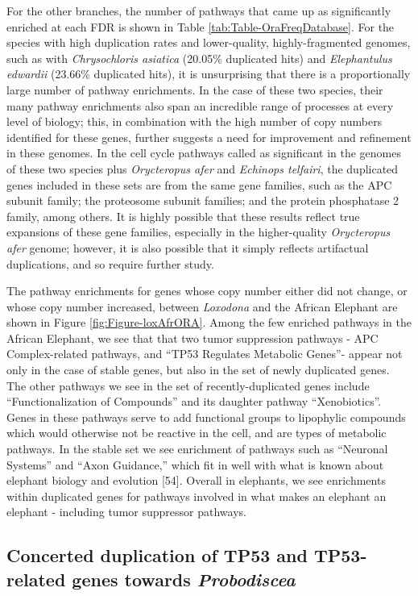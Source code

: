 \documentclass[]{elsarticle} %
\begin{document}
For the other branches, the number of pathways that came up as significantly enriched at each FDR is shown in Table \ref{tab:Table-OraFreqDatabase}. For the species with high duplication rates and lower-quality, highly-fragmented genomes, such as with \emph{Chrysochloris asiatica} (20.05\% duplicated hits) and \emph{Elephantulus edwardii} (23.66\% duplicated hits), it is unsurprising that there is a proportionally large number of pathway enrichments. In the case of these two species, their many pathway enrichments also span an incredible range of processes at every level of biology; this, in combination with the high number of copy numbers identified for these genes, further suggests a need for improvement and refinement in these genomes. In the cell cycle pathways called as significant in the genomes of these two species plus \emph{Orycteropus afer} and \emph{Echinops telfairi}, the duplicated genes included in these sets are from the same gene families, such as the APC subunit family; the proteosome subunit families; and the protein phosphatase 2 family, among others. It is highly possible that these results reflect true expansions of these gene families, especially in the higher-quality \emph{Orycteropus afer} genome; however, it is also possible that it simply reflects artifactual duplications, and so require further study.

The pathway enrichments for genes whose copy number either did not change, or whose copy number increased, between \emph{Loxodona} and the African Elephant are shown in Figure \ref{fig:Figure-loxAfrORA}. Among the few enriched pathways in the African Elephant, we see that that two tumor suppression pathways - APC Complex-related pathways, and ``TP53 Regulates Metabolic Genes''- appear not only in the case of stable genes, but also in the set of newly duplicated genes. The other pathways we see in the set of recently-duplicated genes include ``Functionalization of Compounds'' and its daughter pathway ``Xenobiotics''. Genes in these pathways serve to add functional groups to lipophylic compounds which would otherwise not be reactive in the cell, and are types of metabolic pathways. In the stable set we see enrichment of pathways such as ``Neuronal Systems'' and ``Axon Guidance,'' which fit in well with what is known about elephant biology and evolution {[}54{]}. Overall in elephants, we see enrichments within duplicated genes for pathways involved in what makes an elephant an elephant - including tumor suppressor pathways.

\hypertarget{concerted-duplication-of-tp53-and-tp53-related-genes-towards-probodiscea}{%
\subsection{\texorpdfstring{Concerted duplication of TP53 and TP53-related genes towards \emph{Probodiscea}}{Concerted duplication of TP53 and TP53-related genes towards Probodiscea}}\label{concerted-duplication-of-tp53-and-tp53-related-genes-towards-probodiscea}}
\end{document}
